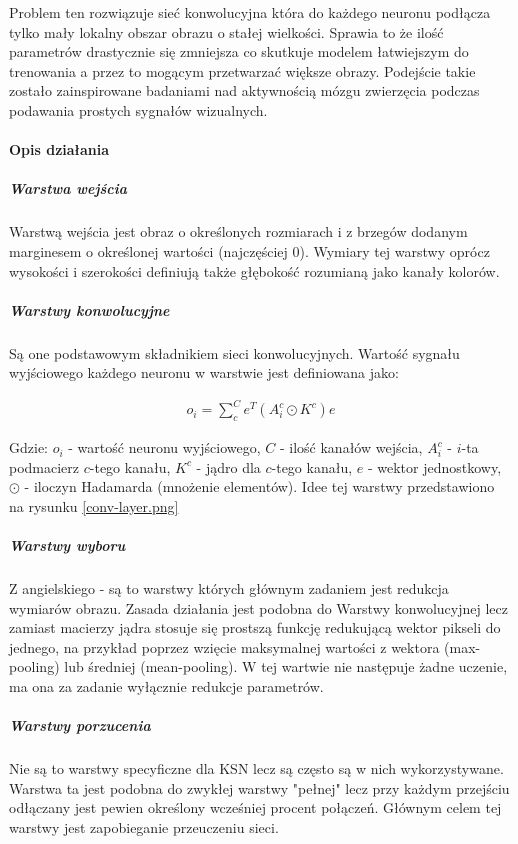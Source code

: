 Problem ten rozwiązuje sieć konwolucyjna która do każdego neuronu podłącza tylko mały lokalny obszar obrazu o stałej wielkości. Sprawia to że ilość parametrów drastycznie się zmniejsza co skutkuje modelem łatwiejszym do trenowania a przez to mogącym przetwarzać większe obrazy. Podejście takie zostało zainspirowane badaniami nad aktywnością mózgu zwierzęcia podczas podawania prostych sygnałów wizualnych.\cite{CNN-cat}
\paragraph{Opis działania}
\subparagraph{Warstwa wejścia} 
Warstwą wejścia jest obraz o określonych rozmiarach i z brzegów dodanym marginesem  o określonej wartości (najczęściej 0). Wymiary tej warstwy oprócz wysokości i szerokości definiują także głębokość rozumianą jako kanały kolorów. \cite{CNN-expl}
\subparagraph{Warstwy konwolucyjne} 
Są one podstawowym składnikiem sieci konwolucyjnych. Wartość sygnału wyjściowego każdego neuronu w warstwie jest definiowana jako:

\begin{align*}
	o_i = \sum^C_c e^T(A^c_i \odot K^c)e
\end{align*}

Gdzie: $o_i$ - wartość neuronu wyjściowego, $C$ - ilość kanałów wejścia, $A^c_i$ - $i$-ta podmacierz $c$-tego kanału, $K^c$ - jądro dla $c$-tego kanału, $e$ - wektor jednostkowy, $\odot$ - iloczyn Hadamarda (mnożenie elementów)\cite{CNN-intro}.
Idee tej warstwy przedstawiono na rysunku \ref{conv-layer.png} \cite{CNN-intro}


\subparagraph{Warstwy wyboru}
Z angielskiego  - są to warstwy których głównym zadaniem jest redukcja wymiarów obrazu. Zasada działania jest podobna do Warstwy konwolucyjnej lecz zamiast macierzy jądra stosuje się prostszą funkcję redukującą wektor pikseli do jednego, na przykład poprzez wzięcie maksymalnej wartości z wektora (max-pooling) lub średniej (mean-pooling). W tej wartwie nie następuje żadne uczenie, ma ona za zadanie wyłącznie redukcje parametrów. \cite{CNN-intro}
\subparagraph{Warstwy porzucenia}
Nie są to warstwy specyficzne dla KSN lecz są często są w nich wykorzystywane. Warstwa ta jest podobna do zwykłej warstwy "pełnej" lecz przy każdym przejściu odłączany jest pewien określony wcześniej procent połączeń. Głównym celem tej warstwy jest zapobieganie przeuczeniu sieci. \cite{CNN-expl}

